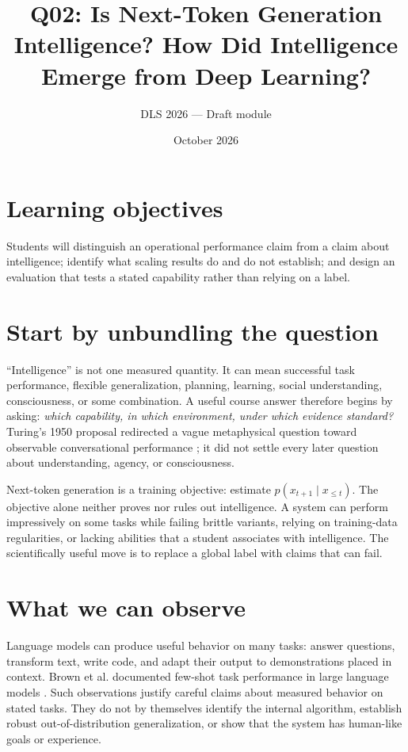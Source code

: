 \documentclass[11pt]{article}
\title{Q02: Is Next-Token Generation Intelligence? How Did Intelligence Emerge from Deep Learning?}
\author{DLS 2026 --- Draft module}\date{October 2026}
\begin{document}
\maketitle
\section*{Learning objectives}
Students will distinguish an operational performance claim from a claim about intelligence; identify what scaling results do and do not establish; and design an evaluation that tests a stated capability rather than relying on a label.

\section{Start by unbundling the question}
``Intelligence'' is not one measured quantity. It can mean successful task performance, flexible generalization, planning, learning, social understanding, consciousness, or some combination. A useful course answer therefore begins by asking: \emph{which capability, in which environment, under which evidence standard?} Turing's 1950 proposal redirected a vague metaphysical question toward observable conversational performance \cite{turing1950}; it did not settle every later question about understanding, agency, or consciousness.

Next-token generation is a training objective: estimate $p(x_{t+1}\mid x_{\leq t})$. The objective alone neither proves nor rules out intelligence. A system can perform impressively on some tasks while failing brittle variants, relying on training-data regularities, or lacking abilities that a student associates with intelligence. The scientifically useful move is to replace a global label with claims that can fail.

\section{What we can observe}
Language models can produce useful behavior on many tasks: answer questions, transform text, write code, and adapt their output to demonstrations placed in context. Brown et al. documented few-shot task performance in large language models \cite{brown2020language}. Such observations justify careful claims about measured behavior on stated tasks. They do not by themselves identify the internal algorithm, establish robust out-of-distribution generalization, or show that the system has human-like goals or experience.
\end{document}
